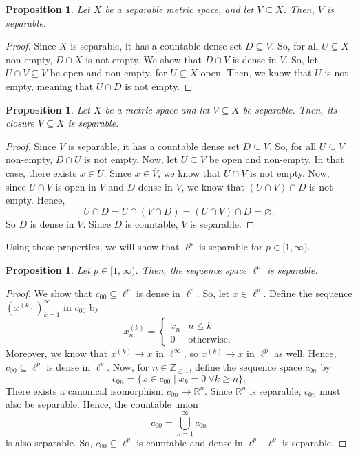 \documentclass[a4paper, openany]{memoir}
\theoremstyle{definition}
\theoremstyle{plain}
\newtheorem{proposition}[definition]{Proposition}
\begin{document}
    \begin{proposition}
        Let $X$ be a separable metric space, and let $V \subseteq X$. Then, $V$ is separable.
    \end{proposition}
    \begin{proof}
        Since $X$ is separable, it has a countable dense set $D \subseteq V$. So, for all $U \subseteq X$ non-empty, $D \cap X$ is not empty. We show that $D \cap V$ is dense in $V$. So, let $U \cap V \subseteq V$ be open and non-empty, for $U \subseteq X$ open. Then, we know that $U$ is not empty, meaning that $U \cap D$ is not empty.
    \end{proof}

    \begin{proposition}
        Let $X$ be a metric space and let $V \subseteq X$ be separable. Then, its closure $\overline{V} \subseteq X$ is separable.
    \end{proposition}
    \begin{proof}
        Since $V$ is separable, it has a countable dense set $D \subseteq V$. So, for all $U \subseteq V$ non-empty, $D \cap U$ is not empty. Now, let $U \subseteq \overline{V}$ be open and non-empty. In that case, there exists $x \in U$. Since $x \in \overline{V}$, we know that $U \cap V$ is not empty. Now, since $U \cap V$ is open in $V$ and $D$ dense in $V$, we know that $(U \cap V) \cap D$ is not empty. Hence,
        \[U \cap D = U \cap (V \cap D) = (U \cap V) \cap D = \varnothing.\]
        So $D$ is dense in $\overline{V}$. Since $D$ is countable, $\overline{V}$ is separable.
    \end{proof}

    Using these properties, we will show that $\ell^p$ is separable for $p \in [1, \infty)$.
    \begin{proposition}
        Let $p \in [1, \infty)$. Then, the sequence space $\ell^p$ is separable.
    \end{proposition}
    \begin{proof}
        We show that $c_{00} \subseteq \ell^p$ is dense in $\ell^p$. So, let $x \in \ell^p$. Define the sequence $(x^{(k)})_{k=1}^\infty$ in $c_{00}$ by
        \[x^{(k)}_n = \begin{cases}
            x_n & n \leq k \\
            0 & \textrm{otherwise}.
        \end{cases}\]
        Moreover, we know that $x^{(k)} \to x$ in $\ell^\infty$, so $x^{(k)} \to x$ in $\ell^p$ as well.
        Hence, $c_{00} \subseteq \ell^p$ is dense in $\ell^p$. Now, for $n \in \mathbb{Z}_{\geq 1}$, define the sequence space $c_{0n}$ by
        \[c_{0n} = \{x \in c_{00} \mid x_k = 0 \ \forall k \geq n\}.\]
        There exists a canonical isomorphism $c_{0n} \to \mathbb{R}^n$. Since $\mathbb{R}^n$ is separable, $c_{0n}$ must also be separable. Hence, the countable union
        \[c_{00} = \bigcup_{n=1}^\infty c_{0n}\]
        is also separable. So, $c_{00} \subseteq \ell^p$ is countable and dense in $\ell^p$- $\ell^p$ is separable.
    \end{proof}
    
\end{document}
